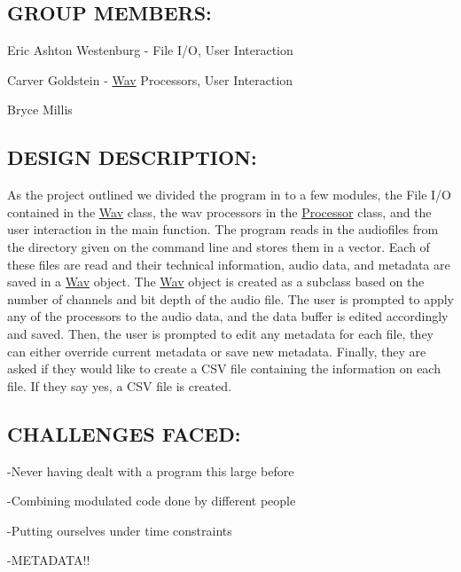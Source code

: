 \subsection*{G\+R\+O\+UP M\+E\+M\+B\+E\+RS\+:}

Eric Ashton Westenburg -\/ File I/O, User Interaction

Carver Goldstein -\/ \hyperlink{classWav}{Wav} Processors, User Interaction

Bryce Millis

\subsection*{D\+E\+S\+I\+GN D\+E\+S\+C\+R\+I\+P\+T\+I\+ON\+:}

As the project outlined we divided the program in to a few modules, the File I/O contained in the \hyperlink{classWav}{Wav} class, the wav processors in the \hyperlink{classProcessor}{Processor} class, and the user interaction in the main function. The program reads in the audiofiles from the directory given on the command line and stores them in a vector. Each of these files are read and their technical information, audio data, and metadata are saved in a \hyperlink{classWav}{Wav} object. The \hyperlink{classWav}{Wav} object is created as a subclass based on the number of channels and bit depth of the audio file. The user is prompted to apply any of the processors to the audio data, and the data buffer is edited accordingly and saved. Then, the user is prompted to edit any metadata for each file, they can either override current metadata or save new metadata. Finally, they are asked if they would like to create a C\+SV file containing the information on each file. If they say yes, a C\+SV file is created.

 

\subsection*{C\+H\+A\+L\+L\+E\+N\+G\+ES F\+A\+C\+ED\+:}

-\/\+Never having dealt with a program this large before

-\/\+Combining modulated code done by different people

-\/\+Putting ourselves under time constraints

-\/\+M\+E\+T\+A\+D\+A\+T\+A!! 